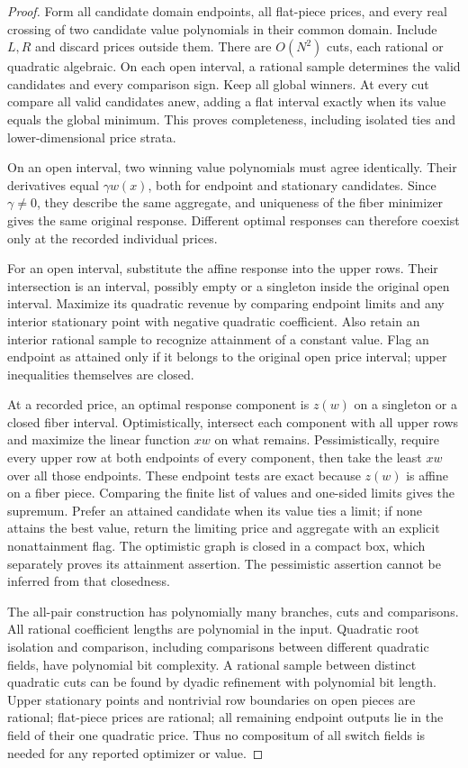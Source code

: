 \begin{proof}
Form all candidate domain endpoints, all flat-piece prices, and every real
crossing of two candidate value polynomials in their common domain. Include
$L,R$ and discard prices outside them. There are $O(N^2)$ cuts, each rational
or quadratic algebraic. On each open interval, a rational sample determines
the valid candidates and every comparison sign. Keep all global winners.
At every cut compare all valid candidates anew, adding a flat interval exactly
when its value equals the global minimum. This proves completeness, including
isolated ties and lower-dimensional price strata.

On an open interval, two winning value polynomials must agree identically.
Their derivatives equal $\gamma w(x)$, both for endpoint and stationary
candidates. Since $\gamma\ne0$, they describe the same aggregate, and uniqueness
of the fiber minimizer gives the same original response. Different optimal
responses can therefore coexist only at the recorded individual prices.

For an open interval, substitute the affine response into the upper rows.
Their intersection is an interval, possibly empty or a singleton inside the
original open interval. Maximize its quadratic revenue by comparing endpoint
limits and any interior stationary point with negative quadratic coefficient.
Also retain an interior rational sample to recognize attainment of a constant
value. Flag an endpoint as attained only if it belongs to the original open
price interval; upper inequalities themselves are closed.

At a recorded price, an optimal response component is $z(w)$ on a singleton
or a closed fiber interval. Optimistically, intersect each component with all
upper rows and maximize the linear function $xw$ on what remains.
Pessimistically, require every upper row at both endpoints of every component,
then take the least $xw$ over all those endpoints. These endpoint tests are
exact because $z(w)$ is affine on a fiber piece. Comparing the finite list of
values and one-sided limits gives the supremum. Prefer an attained candidate
when its value ties a limit; if none attains the best value, return the limiting
price and aggregate with an explicit nonattainment flag. The optimistic graph
is closed in a compact box, which separately proves its attainment assertion.
The pessimistic assertion cannot be inferred from that closedness.

The all-pair construction has polynomially many branches, cuts and comparisons.
All rational coefficient lengths are polynomial in the input. Quadratic root
isolation and comparison, including comparisons between different quadratic
fields, have polynomial bit complexity. A rational sample between distinct
quadratic cuts can be found by dyadic refinement with polynomial bit length.
Upper stationary points and nontrivial row boundaries on open pieces are
rational; flat-piece prices are rational; all remaining endpoint outputs lie
in the field of their one quadratic price. Thus no compositum of all switch
fields is needed for any reported optimizer or value.
\end{proof}


